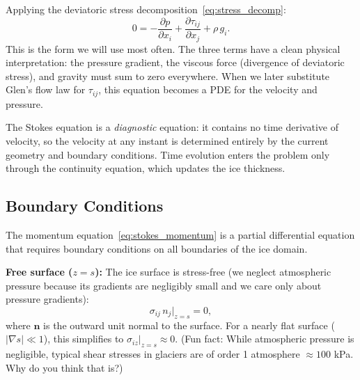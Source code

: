 \documentclass[11pt]{article}
\begin{document}
\medskip
\noindent Applying the deviatoric stress decomposition~\eqref{eq:stress_decomp}:
\begin{equation}
  \boxed{0 = -\frac{\partial p}{\partial x_i} + \frac{\partial \tau_{ij}}{\partial x_j} + \rho\,g_i.}
  \label{eq:stokes_deviatoric}
\end{equation}
This is the form we will use most often.  The three terms have a clean physical interpretation: the pressure gradient, the viscous force (divergence of deviatoric stress), and gravity must sum to zero everywhere.  When we later substitute Glen's flow law for $\tau_{ij}$, this equation becomes a PDE for the velocity and pressure.

\medskip
\noindent The Stokes equation is a \emph{diagnostic} equation: it contains no time derivative of velocity, so the velocity at any instant is determined entirely by the current geometry and boundary conditions.  Time evolution enters the problem only through the continuity equation, which updates the ice thickness.


\subsection{Boundary Conditions}

The momentum equation~\eqref{eq:stokes_momentum} is a partial differential equation that requires boundary conditions on all boundaries of the ice domain.

\medskip
\noindent\textbf{Free surface ($z = s$):}  The ice surface is stress-free (we neglect atmospheric pressure because its gradients are negligibly small and we care only about pressure gradients):
\begin{equation}
  \sigma_{ij}\,n_j\big|_{z=s} = 0,
  \label{eq:bc_surface}
\end{equation}
where $\bm{n}$ is the outward unit normal to the surface.  For a nearly flat surface ($|\nabla s| \ll 1$), this simplifies to $\sigma_{iz}\big|_{z=s} \approx 0$. (Fun fact: While atmospheric pressure is negligible, typical shear stresses in glaciers are of order 1 atmosphere $\approx 100$ kPa. Why do you think that is?) 
\end{document}

